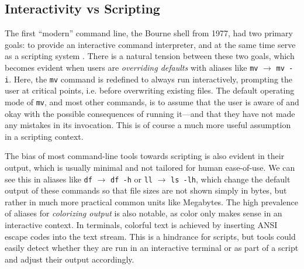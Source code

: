 \documentclass[smallextended,natbib]{svjour3}
\newcommand{\alias}[2]{{\texttt{#1} $\rightarrow$ \texttt{#2}}}
\newcommand{\cmd}[1]{{\texttt{#1}}}
\begin{document}
\subsection{Interactivity vs Scripting}

The first ``modern'' command line, the Bourne shell from 1977, had two primary goals: to provide an interactive command interpreter, and at the same time serve as a scripting system \citep{jones:11}.
There is a natural tension between these two goals, which becomes evident when users are \emph{overriding defaults} with aliases like \alias{mv}{mv~-i}.
Here, the \cmd{mv} command is redefined to always run interactively, prompting the user at critical points, i.e. before overwriting existing files.
The default operating mode of \cmd{mv}, and most other commands, is to assume that the user is aware of and okay with the possible consequences of running it---and that they have not made any mistakes in its invocation.
This is of course a much more useful assumption in a scripting context.

The bias of most command-line tools towards scripting is also evident in their output, which is usually minimal and not tailored for human ease-of-use.
We can see this in aliases like \alias{df}{df~-h} or \alias{ll}{ls~-lh}, which change the default output of these commands so that file sizes are not shown simply in bytes, but rather in much more practical common units like Megabytes.
The high prevalence of aliases for \emph{colorizing output} is also notable, as color only makes sense in an interactive context.
In terminals, colorful text is achieved by inserting ANSI escape codes into the text stream.
This is a hindrance for scripts, but tools could easily detect whether they are run in an interactive terminal or as part of a script and adjust their output accordingly.
\end{document}
